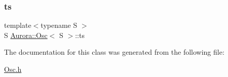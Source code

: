 \subsubsection{\texorpdfstring{ts}{ts}}
{\footnotesize\ttfamily template$<$typename S $>$ \\
S \hyperlink{class_aurora_1_1_osc}{Aurora\+::\+Osc}$<$ S $>$\+::ts\hspace{0.3cm}{\ttfamily [protected]}}



The documentation for this class was generated from the following file\+:\begin{DoxyCompactItemize}
\item 
\hyperlink{_osc_8h}{Osc.\+h}\end{DoxyCompactItemize}
